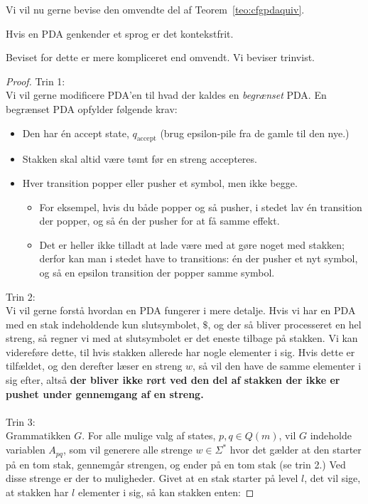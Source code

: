 Vi vil nu gerne bevise den omvendte del af Teorem~\ref{teo:cfgpdaquiv}.
\begin{lemma}
	Hvis en PDA genkender et sprog er det kontekstfrit.
\end{lemma}
Beviset for dette er mere kompliceret end omvendt. Vi beviser trinvist.

\begin{proof}
	Trin 1:\\
	\noindent
	Vi vil gerne modificere PDA'en til hvad der kaldes en \textit{begrænset} PDA. En begrænset PDA opfylder følgende krav:
	\begin{itemize}
		\item Den har én accept state, $q_{\text{accept}}$ (brug epsilon-pile fra de gamle til den nye.)
		\item Stakken skal altid være tømt før en streng accepteres.
		\item Hver transition popper eller pusher et symbol, men ikke begge.
		      \begin{itemize}
			      \item For eksempel, hvis du både popper og så pusher, i stedet lav én transition der popper, og så én der pusher for at få samme effekt.
			      \item Det er heller ikke tilladt at lade være med at gøre noget med stakken; derfor kan man i stedet have to transitions: én der pusher et nyt symbol, og så en epsilon transition der popper samme symbol.
		      \end{itemize}
	\end{itemize}
	Trin 2:\\
	\noindent
	Vi vil gerne forstå hvordan en PDA fungerer i mere detalje. Hvis vi har en PDA med en stak indeholdende kun slutsymbolet, $\$$, og der så bliver processeret en hel streng, så regner vi med at slutsymbolet er det eneste tilbage på stakken. Vi kan videreføre dette, til hvis stakken allerede har nogle elementer i sig. Hvis dette er tilfældet, og den derefter læser en streng $w$, så vil den have de samme elementer i sig efter, altså \textbf{der bliver ikke rørt ved den del af stakken der ikke er pushet under gennemgang af en streng.}\\\\
	\noindent
	Trin 3:\\
	\noindent
	Grammatikken $G$. For alle mulige valg af states, $p, q \in Q(m)$, vil $G$ indeholde variablen $A_{pq}$, som vil generere alle strenge $w \in \Sigma^*$ hvor det gælder at den starter på en tom stak, gennemgår strengen, og ender på en tom stak (se trin 2.) Ved disse strenge er der to muligheder. Givet at en stak starter på level $l$, det vil sige, at stakken har $l$ elementer i sig, så kan stakken enten:

\end{proof}
